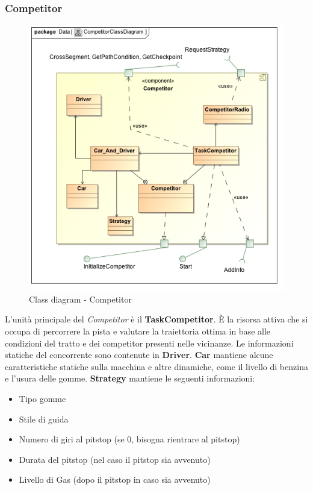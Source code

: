 \subsubsection{Competitor}
\begin{center}
\begin{figure}[h!]
	\includegraphics[scale=0.50]{img/ClassDiagrams/CompetitorClassDiagram.jpg}
\caption{Class diagram - Competitor}
\end{figure}
\end{center}
L'unit\`{a} principale del \emph{Competitor} \`{e} il \textbf{TaskCompetitor}. \`{E} la risorsa attiva che si occupa di percorrere la pista e valutare
la traiettoria ottima in base alle condizioni del tratto e dei competitor presenti nelle vicinanze. Le informazioni statiche del concorrente
sono contenute in \textbf{Driver}. \textbf{Car} mantiene alcune caratteristiche statiche sulla macchina e altre dinamiche, come il livello
di benzina e l'usura delle gomme. \textbf{Strategy} mantiene le seguenti informazioni:
\begin{itemize}
\item Tipo gomme
\item Stile di guida
\item Numero di giri al pitstop (se 0, bisogna rientrare al pitstop)
\item Durata del pitstop (nel caso il pitstop sia avvenuto)
\item Livello di Gas (dopo il pitstop in caso sia avvenuto)
\end{itemize}
